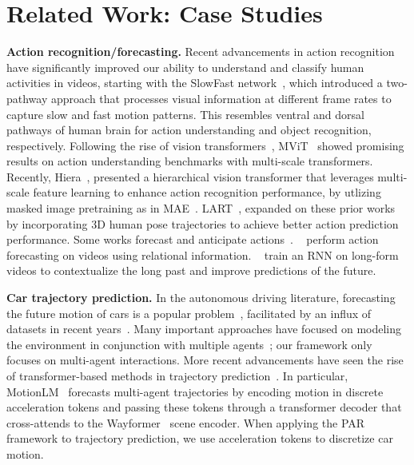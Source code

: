\clearpage
\setcounter{page}{1}
\maketitleappendix

\section{Related Work: Case Studies}
\label{sec:case_study_related}
\textbf{Action recognition/forecasting.} Recent advancements in action recognition have significantly improved our ability to understand and classify human activities in videos, starting with the SlowFast network~\citep{feichtenhofer2019slowfast}, which introduced a two-pathway approach that processes visual information at different frame rates to capture slow and fast motion patterns. This resembles ventral and dorsal pathways of human brain for action understanding and object recognition, respectively. Following the rise of vision transformers~\citep{dosovitskiy2020image}, MViT~\citep{fan2021multiscale} showed promising results on action understanding benchmarks with multi-scale transformers. Recently, Hiera~\citep{ryali2023hiera}, presented a hierarchical vision transformer that leverages multi-scale feature learning to enhance action recognition performance, by utlizing masked image pretraining as in MAE~\cite{he2022masked}. LART~\citep{rajasegaran2023benefits},  expanded on these prior works by incorporating 3D human pose trajectories to achieve better action prediction performance. Some works forecast and anticipate actions~\cite{lai2024human}. ~\citep{sun2019relational} perform action forecasting on videos using relational information. ~\citep{loh2022long} train an RNN on long-form videos to contextualize the long past and improve predictions of the future.

\medskip
\noindent
\textbf{Car trajectory prediction.}
In the autonomous driving literature, forecasting the future motion of cars is a popular problem~\citep{huang2022survey,cui2024survey}, facilitated by an influx of datasets in recent years~\citep{chang2019argoverse,nuscenes,sun2020scalability}. Many important approaches have focused on modeling the environment in conjunction with multiple agents~\citep{casas2018intentnet, cui2019multimodal,salzmann2020trajectron++}; our framework only focuses on multi-agent interactions.
More recent advancements have seen the rise of transformer-based methods in trajectory prediction~\citep{ngiam2021scene,yuan2021agentformer}.
In particular, MotionLM~\citep{seff2023motionlm} forecasts multi-agent trajectories by encoding motion in discrete acceleration tokens and passing these tokens through a transformer decoder that cross-attends to the Wayformer~\citep{nayakanti2023wayformer} scene encoder. When applying the PAR framework to trajectory prediction, we use acceleration tokens to discretize car motion.


